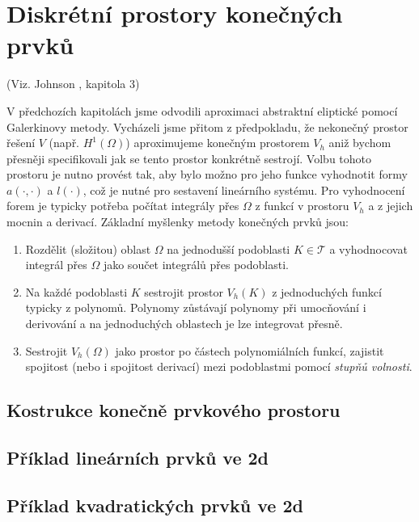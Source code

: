 \section{Diskrétní prostory konečných prvků}
(Viz. Johnson \cite{Johnson}, kapitola 3)

V předchozích kapitolách jsme odvodili aproximaci abstraktní eliptické pomocí Galerkinovy metody.
Vycházeli jsme přitom z předpokladu, že nekonečný prostor řešení $V$ (např. $H^1(\Omega)$) aproximujeme
konečným prostorem $V_h$ aniž bychom přesněji specifikovali jak se tento prostor konkrétně sestrojí.
Volbu tohoto prostoru je nutno provést tak, aby bylo možno pro jeho funkce vyhodnotit formy $a(\cdot, \cdot)$
a $l(\cdot)$, což je nutné pro sestavení lineárního systému. Pro vyhodnocení forem je typicky potřeba 
počítat integrály přes $\Omega$ z funkcí v prostoru $V_h$ a z jejich mocnin a derivací. 
Základní myšlenky metody konečných prvků jsou:
\begin{enumerate}
 \item Rozdělit (složitou) oblast $\Omega$ na jednodušší podoblasti $K\in \mathcal T$ a vyhodnocovat integrál přes 
 $\Omega$ jako součet integrálů přes podoblasti.
 \item Na každé podoblasti $K$ sestrojit prostor $V_h(K)$ z jednoduchých funkcí typicky z polynomů. Polynomy zůstávají polynomy 
 při umocňování i derivování a na jednoduchých oblastech je lze integrovat přesně.
 \item Sestrojit $V_h(\Omega)$ jako prostor po částech polynomiálních funkcí, zajistit spojitost (nebo i spojitost derivací) mezi podoblastmi 
 pomocí {\it stupňů volnosti}.
\end{enumerate}

\subsection{Kostrukce konečně prvkového prostoru}

\subsection{Příklad lineárních prvků ve 2d}

\subsection{Příklad kvadratických prvků ve 2d}
